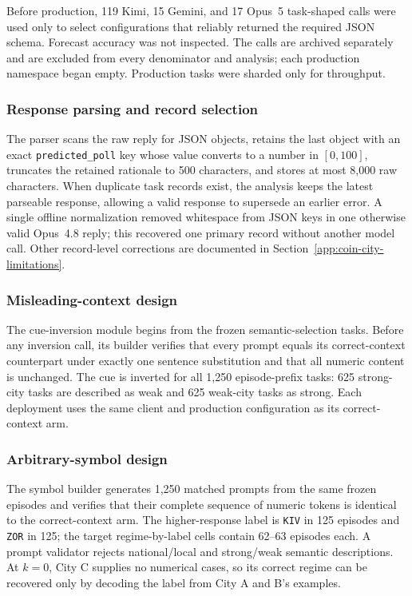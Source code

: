 Before production, 119 Kimi, 15 Gemini, and 17 Opus~5 task-shaped calls were used
only to select configurations that reliably returned the required JSON schema.
Forecast accuracy was not inspected. The calls are archived separately and are
excluded from every denominator and analysis; each production namespace began
empty. Production tasks were sharded only for throughput.

\subsubsection{Response parsing and record selection}
The parser scans the raw reply for JSON objects, retains the last object with an
exact \texttt{predicted\_poll} key whose value converts to a number in
\([0,100]\), truncates the retained rationale to 500 characters, and stores at
most 8,000 raw characters. When duplicate task records exist, the analysis keeps
the latest parseable response, allowing a valid response to supersede an earlier
error. A single offline normalization removed whitespace from JSON keys in one
otherwise valid Opus~4.8 reply; this recovered one primary record without another
model call. Other record-level corrections are documented in
Section~\ref{app:coin-city-limitations}.

\subsubsection{Misleading-context design}
The cue-inversion module begins from the frozen semantic-selection tasks. Before
any inversion call, its builder verifies that every prompt equals its
correct-context counterpart under
exactly one sentence substitution and that all numeric content is unchanged. The
cue is inverted for all 1,250 episode-prefix tasks: 625 strong-city tasks are
described as weak and 625 weak-city tasks as strong. Each deployment uses the
same client and production configuration as its correct-context arm.

\subsubsection{Arbitrary-symbol design}
The symbol builder generates 1,250 matched prompts from the same frozen
episodes and verifies that their complete sequence of numeric tokens is identical
to the correct-context arm. The higher-response label is \texttt{KIV} in 125
episodes and \texttt{ZOR} in 125; the target regime-by-label cells contain 62--63
episodes each. A prompt validator rejects national/local and strong/weak semantic
descriptions. At \(k=0\), City C supplies no numerical cases, so its correct regime
can be recovered only by decoding the label from City A and B's examples.

